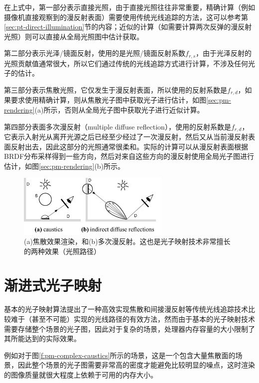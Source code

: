\noindent 在上式中，第一部分表示直接光照，由于直接光照往往非常重要，精确计算（例如摄像机直接观察到的漫反射表面）需要使用传统光线追踪的方法，这可以参考第\ref{sec:pt-direct-illumination}节的内容；近似的计算（如需要计算两次反弹的漫反射光照）则可以直接从全局光照图中估计获取。

第二部分表示光泽/镜面反射，使用的是光照/镜面反射系数$f_{r,s}$，由于光泽反射的光照贡献值通常很大，所以它们通过传统的光线追踪方式进行计算，不涉及任何光子的估计。

第三部分表示焦散光照，它仅发生于漫反射表面，所以使用的反射系数是$f_{r,d}$，如果要求使用精确计算，则从焦散光子图中获取光子进行估计，如图\ref{sec:pm-rendering}(a)所示，否则从全局光子图中获取光子进行近似计算。

第四部分表面多次漫反射（multiple diffuse reflection），使用的反射系数是$f_{r,d}$，它表示入射光从离开光源之后已经至少经过了一次漫反射，然后又从当前漫反射表面反射出去，因此这部分的光照通常很柔和。实际的计算可以从漫反射表面根据BRDF分布采样得到一些方向，然后对来自这些方向的漫反射使用全局光子图进行估计，如图\ref{sec:pm-rendering}(b)所示。

\begin{figure}
	\sidecaption
	\includegraphics[width=0.65\textwidth]{figures/pm/rendering}
	\caption{(a)焦散效果渲染，和(b)多次漫反射。这也是光子映射技术非常擅长的两种效果（光照路径）}
	\label{f:pm-rendering}
\end{figure}







\section{渐进式光子映射}\label{sec:pm-progressive-pm}
基本的光子映射算法提出了一种高效实现焦散和间接漫反射等传统光线追踪技术比较难于（甚至不可能）实现的光线路径的有效方法，然而由于基本的光子映射技术需要存储整个场景的光子图，因此对于复杂的场景，处理器内存容量的大小限制了其所能达到的实际效果。

例如对于图\ref{f:pm-complex-caustics}所示的场景，这是一个包含大量焦散面的场景，因此整个场景的光子图需要非常高的密度才能避免比较明显的噪点，这时渲染的图像质量就很大程度上依赖于可用的内存大小。

